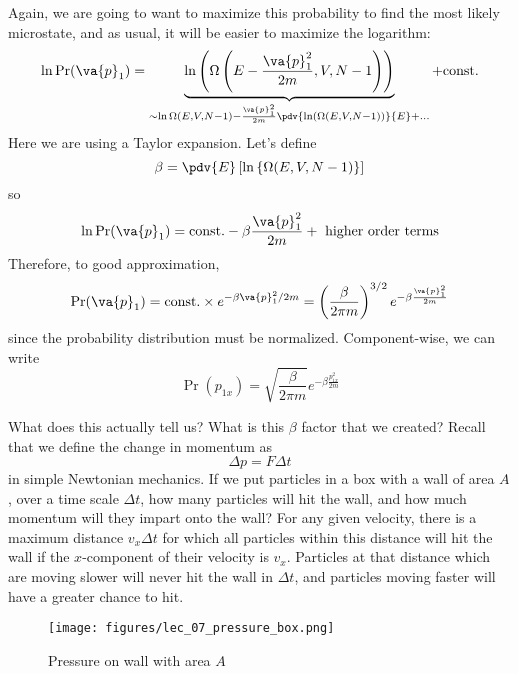 \documentclass[a4paper,twoside,master.tex]{subfiles}
\begin{document}
Again, we are going to want to maximize this probability to find the most likely microstate, and as usual, it will be easier to maximize the logarithm:
\begin{equation}
    \ln{\Pr(\va{p}_1)} = \underbrace{\ln\left( \Omega \left( E - \frac{\va{p}_1^2}{2m}, V, N-1 \right) \right)}_{\sim \ln{\Omega(E, V, N-1) - \frac{\va{p}_1^2}{2m} \pdv{\ln(\Omega(E, V, N-1))}{E}} + \ldots} + \text{const.}
\end{equation}
Here we are using a Taylor expansion. Let's define
\begin{equation}
    \beta = \pdv{E} \left[ \ln\left\{ \Omega(E, V, N-1) \right\} \right]
\end{equation}
so
\begin{equation}
    \ln{\Pr(\va{p}_1)} = \text{const.} - \beta \frac{\va{p}^2_1}{2m} + \text{ higher order terms}
\end{equation}
Therefore, to good approximation,
\begin{equation}
    \Pr(\va{p}_1) = \text{const.} \times e^{- \beta \va{p}^2_1 / 2m} = \left( \frac{\beta}{2 \pi m} \right)^{3/2} e^{- \beta \frac{\va{p}_1^2}{2m}}
\end{equation}
since the probability distribution must be normalized. Component-wise, we can write
\begin{equation}
    \Pr(p_{1x}) = \sqrt{\frac{\beta}{2 \pi m}} e^{- \beta \frac{p_{1x}^2}{2m}} 
\end{equation}

What does this actually tell us? What is this $ \beta $ factor that we created? Recall that we define the change in momentum as
\begin{equation}
    \Delta p = F \Delta t
\end{equation}
in simple Newtonian mechanics. If we put particles in a box with a wall of area $ A $, over a time scale $ \Delta t $, how many particles will hit the wall, and how much momentum will they impart onto the wall? For any given velocity, there is a maximum distance $ v_x \Delta t $ for which all particles within this distance will hit the wall if the $ x $-component of their velocity is $ v_x $. Particles at that distance which are moving slower will never hit the wall in $ \Delta t $, and particles moving faster will have a greater chance to hit.

\begin{figure}[h]
    \centering
    \texttt{[image: figures/lec\_07\_pressure\_box.png]}
    \caption{Pressure on wall with area $ A $}
    \label{fig:lec_07_pressure_box}
\end{figure}
\end{document}
